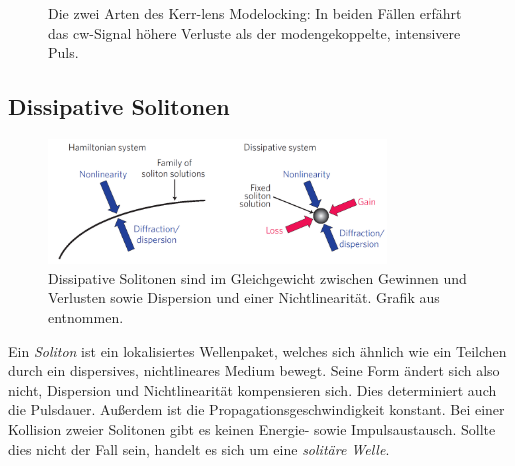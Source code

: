 \documentclass[bachelor,       %
               twoside,        %
               BCOR10mm,       %
               liststotoc,nomtotoc,bibtotoc, %
               english,ngerman, %
               final,          %
               ]{GAUBM}
\begin{document}
\begin{figure}[!htb]
   \centering
   \hfill
   \caption{Die zwei Arten des Kerr-lens Modelocking\protect\footnotemark: In beiden Fällen erfährt das cw-Signal höhere Verluste als der modengekoppelte, intensivere Puls.}
   \label{fig:KLM}
\end{figure}
\clearpage
\subsection{Dissipative Solitonen}
\label{sec:soliton}
\begin{figure}[!htb]
	\centering
	\includegraphics[width=0.8\textwidth]{figures/dissipativeSoliton2}
	\caption{Dissipative Solitonen sind im Gleichgewicht zwischen Gewinnen und Verlusten sowie Dispersion und einer Nichtlinearität. Grafik aus \cite{grelu_dissipative_2012} entnommen.}
	\label{fig:DissipativeSoliton}
\end{figure}
Ein \textit{Soliton} ist ein lokalisiertes Wellenpaket, welches sich ähnlich wie ein Teilchen durch ein dispersives, nichtlineares Medium bewegt.
Seine Form ändert sich also nicht, Dispersion und Nichtlinearität kompensieren sich.
Dies determiniert auch die Pulsdauer.
Außerdem ist die Propagationsgeschwindigkeit konstant.
Bei einer Kollision zweier Solitonen gibt es keinen Energie- sowie Impulsaustausch.
Sollte dies nicht der Fall sein, handelt es sich um eine \textit{solitäre Welle}.
\end{document}
